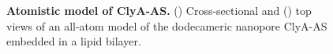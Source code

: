 \begin{figure}[htbp]
\centering
\begin{subfigure}[t]{6cm}
	\centering
	\caption{}\label{fig:clya_atomistic_side}

	
\end{subfigure}
\begin{subfigure}[t]{6cm}
	\centering
	\caption{}\label{fig:clya_atomistic_top}
\end{subfigure}


\caption[\textbf{Atomistic model of ClyA-AS.}]
{
\textbf{Atomistic model of ClyA-AS.}
() Cross-sectional and () top views of an all-atom model of the dodecameric nanopore ClyA-AS embedded in a lipid bilayer.
}
\label{fig:clya_atomistic}
\end{figure}

